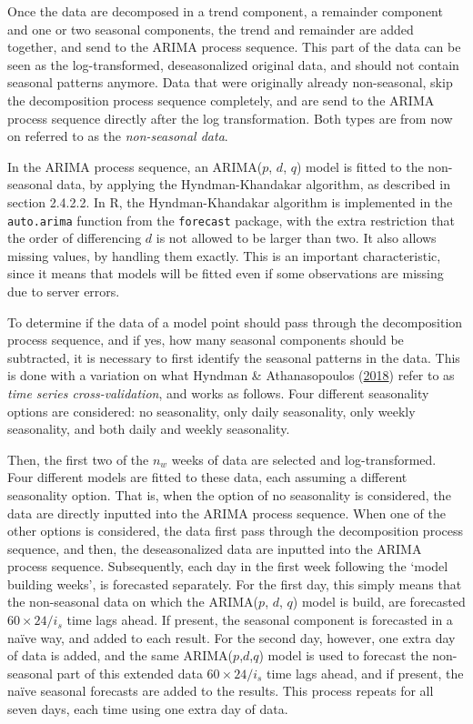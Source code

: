 \documentclass[12pt,oneside]{reedthesis}
\begin{document}
Once the data are decomposed in a trend component, a remainder component
and one or two seasonal components, the trend and remainder are added
together, and send to the ARIMA process sequence. This part of the data
can be seen as the log-transformed, deseasonalized original data, and
should not contain seasonal patterns anymore. Data that were originally
already non-seasonal, skip the decomposition process sequence
completely, and are send to the ARIMA process sequence directly after
the log transformation. Both types are from now on referred to as the
\emph{non-seasonal data}.

In the ARIMA process sequence, an ARIMA(\(p\), \(d\), \(q\)) model is
fitted to the non-seasonal data, by applying the Hyndman-Khandakar
algorithm, as described in section 2.4.2.2. In R, the Hyndman-Khandakar
algorithm is implemented in the \texttt{auto.arima} function from the
\texttt{forecast} package, with the extra restriction that the order of
differencing \(d\) is not allowed to be larger than two. It also allows
missing values, by handling them exactly. This is an important
characteristic, since it means that models will be fitted even if some
observations are missing due to server errors.

To determine if the data of a model point should pass through the
decomposition process sequence, and if yes, how many seasonal components
should be subtracted, it is necessary to first identify the seasonal
patterns in the data. This is done with a variation on what Hyndman \&
Athanasopoulos (\protect\hyperlink{ref-hyndman2018fpp}{2018}) refer to
as \emph{time series cross-validation}, and works as follows. Four
different seasonality options are considered: no seasonality, only daily
seasonality, only weekly seasonality, and both daily and weekly
seasonality.

Then, the first two of the \(n_{w}\) weeks of data are selected and
log-transformed. Four different models are fitted to these data, each
assuming a different seasonality option. That is, when the option of no
seasonality is considered, the data are directly inputted into the ARIMA
process sequence. When one of the other options is considered, the data
first pass through the decomposition process sequence, and then, the
deseasonalized data are inputted into the ARIMA process sequence.
Subsequently, each day in the first week following the `model building
weeks', is forecasted separately. For the first day, this simply means
that the non-seasonal data on which the ARIMA(\(p\), \(d\), \(q\)) model
is build, are forecasted \(60 \times 24 / i_{s}\) time lags ahead. If
present, the seasonal component is forecasted in a naïve way, and added
to each result. For the second day, however, one extra day of data is
added, and the same ARIMA(\(p\),\(d\),\(q\)) model is used to forecast
the non-seasonal part of this extended data \(60 \times 24 / i_{s}\)
time lags ahead, and if present, the naïve seasonal forecasts are added
to the results. This process repeats for all seven days, each time using
one extra day of data.
\end{document}
